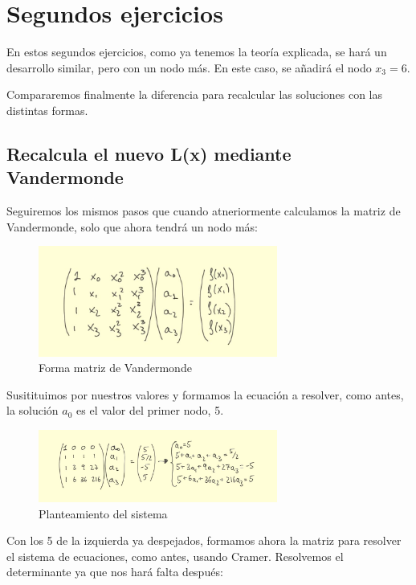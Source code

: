 \documentclass{article}
\begin{document}
\newpage

\section{Segundos ejercicios}

En estos segundos ejercicios, como ya tenemos la teoría explicada, se hará un desarrollo similar, pero con un nodo más. En este caso, se añadirá el nodo $x_{3} = 6$.

Compararemos finalmente la diferencia para recalcular las soluciones con las distintas formas.

\subsection{Recalcula el nuevo L(x) mediante Vandermonde}

Seguiremos los mismos pasos que cuando atneriormente calculamos la matriz de Vandermonde, solo que ahora tendrá un nodo más:

\begin{figure}[h]
  \center
  \includegraphics[width=0.7\textwidth]{src/vandermonde2_1.jpg}
  \caption{Forma matriz de Vandermonde}
\end{figure}

Susitituimos por nuestros valores y formamos la ecuación a resolver, como antes, la solución $a_{0}$ es el valor del primer nodo, 5. 

\begin{figure}[h]
  \center
  \includegraphics[width=0.7\textwidth]{src/vandermonde2_2.jpg}
  \caption{Planteamiento del sistema }
\end{figure}

Con los 5 de la izquierda ya despejados, formamos ahora la matriz para resolver el sistema de ecuaciones, como antes, usando Cramer. Resolvemos el determinante ya que nos hará falta después: 
\end{document}
